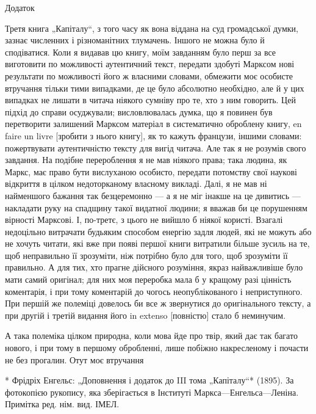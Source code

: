 Додаток

Третя книга „Капіталу“, з того часу як вона віддана на суд громадської думки, зазнає численних і
різноманітних тлумачень. Іншого не можна було й сподіватися. Коли я видавав цю книгу, моїм
завданням було перш за все виготовити по можливості аутентичний текст, передати здобуті Марксом
нові результати по можливості його ж власними словами, обмежити моє особисте втручання тільки тими випадками, де це
було абсолютно необхідно, але й у цих випадках не лишати в читача ніякого
сумніву про те, хто з ним говорить. Цей підхід до справи осуджували; висловлювалась думка, що я
повинен був перетворити залишений Марксом матеріал в систематично оброблену книгу, en faire un
livre [зробити з нього книгу], як то кажуть французи, іншими словами: пожертвувати аутентичністю
тексту для вигід читача. Але так я не розумів свого завдання. На подібне перероблення я не мав
ніякого права; така людина, як Маркс, має право бути вислуханою особисто, передати потомству
свої наукові відкриття в цілком недоторканому власному викладі. Далі, я не мав ні найменшого
бажання так безцеремонно — а я не міг інакше на це дивитись — накладати руку на спадщину такої видатної людини; я вважав би це порушенням вірності Марксові. І, по-третє, з цього не вийшло б
ніякої користі. Взагалі недоцільно витрачати будьяким способом енергію задля людей, які не можуть або не хочуть читати, які вже при появі першої книги витратили більше зусиль на те, щоб
неправильно її зрозуміти, ніж потрібно було для того, щоб зрозуміти її правильно. А для тих, хто
прагне дійсного розуміння, якраз найважливіше було мати самий оригінал; для них моя переробка
мала б у кращому разі цінність коментарія, і при тому коментарій до чогось неопублікованого і
неприступного. При першій же полеміці довелось би все ж звернутися до оригінального тексту, а
при другій і третій видання його in extenso [повністю] стало б неминучим.

А така полеміка цілком
природна, коли мова йде про твір, який дає так багато нового, і при тому в першому обробленні,
лише побіжно накресленому і почасти не без прогалин. Отут моє втручання

* Фрідріх Енгельс: „Доповнення і додаток до III тома „Капіталу“* (1895). За фотокопією рукопису,
яка зберігається в Інституті Маркса—Енгельса—Леніна. Примітка ред. нім. вид. ІМЕЛ.
\parbreak{}  %
